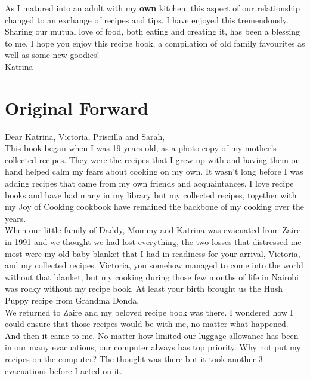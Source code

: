 \documentclass[letterpaper, 12pt]{memoir} %
\begin{document}
As I matured into an adult with my \textbf{own} kitchen, this aspect of our relationship changed to an exchange of recipes and tips. I have enjoyed this tremendously. Sharing our mutual love of food, both eating and creating it, has been a blessing to me. I hope you enjoy this recipe book, a compilation of old family favourites as well as some new goodies! \\[10pt]

\hspace{0.5\linewidth}Katrina

\chapter*{Original Forward} %

Dear Katrina, Victoria, Priscilla and Sarah, \\[10pt]

This book began when I was 19 years old, as a photo copy of my mother's collected recipes. They were the recipes that I grew up with and having them on hand helped calm my fears about cooking on my own. It wasn't long before I was adding recipes that came from my own friends and acquaintances. I love recipe books and have had many in my library but my collected recipes, together with my Joy of Cooking cookbook have remained the backbone of my cooking over the years. \\[10pt]

When our little family of Daddy, Mommy and Katrina was evacuated from Zaire in 1991 and we thought we had lost everything, the two losses that distressed me most were my old baby blanket that I had in readiness for your arrival, Victoria, and my collected recipes. Victoria, you somehow managed to come into the world without that blanket, but my cooking during those few months of life in Nairobi was rocky without my recipe book. At least your birth brought us the Hush Puppy recipe from Grandma Donda. \\[10pt]

We returned to Zaire and my beloved recipe book was there. I wondered how I could ensure that those recipes would be with me, no matter what happened. And then it came to me. No matter how limited our luggage allowance has been in our many evacuations, our computer always has top priority. Why not put my recipes on the computer? The thought was there but it took another 3 evacuations before I acted on it. \\[10pt]
\end{document}
